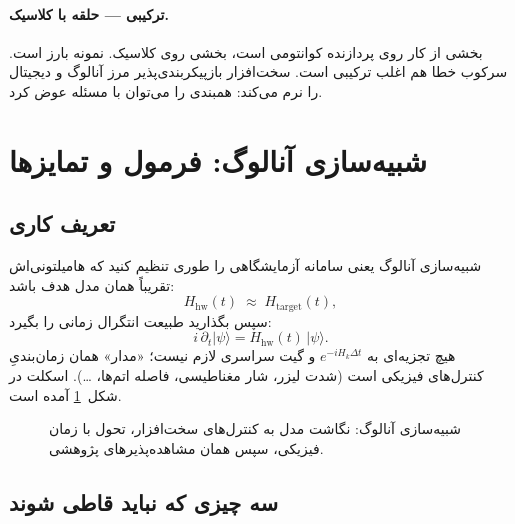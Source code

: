\paragraph{ترکیبی --- حلقه با کلاسیک.}
بخشی از کار روی پردازنده کوانتومی است، بخشی روی کلاسیک.  نمونه بارز است. سرکوب خطا هم اغلب ترکیبی است. سخت‌افزار بازپیکربندی‌پذیر مرز آنالوگ و دیجیتال را نرم می‌کند: همبندی را می‌توان با مسئله عوض کرد.

\section{شبیه‌سازی آنالوگ: فرمول و تمایزها}
\label{sec:analog}

\subsection{تعریف کاری}

شبیه‌سازی آنالوگ یعنی سامانه آزمایشگاهی را طوری تنظیم کنید که هامیلتونی‌اش تقریباً همان مدل هدف باشد:
\begin{equation}
	\label{eq:analog-map}
	H_{\mathrm{hw}}(t) \;\approx\; H_{\mathrm{target}}(t),
\end{equation}
سپس بگذارید طبیعت انتگرال زمانی را بگیرد:
\begin{equation}
	i\,\partial_t\lvert\psi\rangle = H_{\mathrm{hw}}(t)\,\lvert\psi\rangle.
\end{equation}
هیچ تجزیه‌ای به $e^{-iH_k\Delta t}$ و گیت سراسری لازم نیست؛ «مدار» همان زمان‌بندیِ کنترل‌های فیزیکی است (شدت لیزر، شار مغناطیسی، فاصله اتم‌ها، \ldots). اسکلت در شکل~\ref{fig:analog-sim} آمده است.

\begin{figure}[htbp]
	\centering
	\begin{latin}
		\resizebox{\ifdim\width>\textwidth\textwidth\else\width\fi}{!}{%
		}
	\end{latin}
	\caption{شبیه‌سازی آنالوگ: نگاشت مدل به کنترل‌های سخت‌افزار، تحول با زمان فیزیکی، سپس همان مشاهده‌پذیرهای پژوهشی.}
	\label{fig:analog-sim}
\end{figure}

\subsection{سه چیزی که نباید قاطی شوند}

